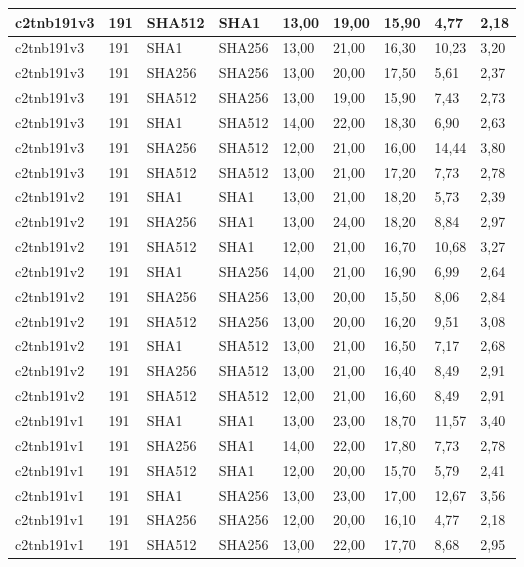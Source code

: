 \begin{longtable}{| l | l | l | l | l |l |l |l |l |}
c2tnb191v3 & 191 & SHA512 & SHA1 & 13,00 & 19,00 & 15,90 & 4,77 & 2,18 \\ \hline 
c2tnb191v3 & 191 & SHA1 & SHA256 & 13,00 & 21,00 & 16,30 & 10,23 & 3,20 \\ \hline 
c2tnb191v3 & 191 & SHA256 & SHA256 & 13,00 & 20,00 & 17,50 & 5,61 & 2,37 \\ \hline 
c2tnb191v3 & 191 & SHA512 & SHA256 & 13,00 & 19,00 & 15,90 & 7,43 & 2,73 \\ \hline 
c2tnb191v3 & 191 & SHA1 & SHA512 & 14,00 & 22,00 & 18,30 & 6,90 & 2,63 \\ \hline 
c2tnb191v3 & 191 & SHA256 & SHA512 & 12,00 & 21,00 & 16,00 & 14,44 & 3,80 \\ \hline 
c2tnb191v3 & 191 & SHA512 & SHA512 & 13,00 & 21,00 & 17,20 & 7,73 & 2,78 \\ \hline 
c2tnb191v2 & 191 & SHA1 & SHA1 & 13,00 & 21,00 & 18,20 & 5,73 & 2,39 \\ \hline 
c2tnb191v2 & 191 & SHA256 & SHA1 & 13,00 & 24,00 & 18,20 & 8,84 & 2,97 \\ \hline 
c2tnb191v2 & 191 & SHA512 & SHA1 & 12,00 & 21,00 & 16,70 & 10,68 & 3,27 \\ \hline 
c2tnb191v2 & 191 & SHA1 & SHA256 & 14,00 & 21,00 & 16,90 & 6,99 & 2,64 \\ \hline 
c2tnb191v2 & 191 & SHA256 & SHA256 & 13,00 & 20,00 & 15,50 & 8,06 & 2,84 \\ \hline 
c2tnb191v2 & 191 & SHA512 & SHA256 & 13,00 & 20,00 & 16,20 & 9,51 & 3,08 \\ \hline 
c2tnb191v2 & 191 & SHA1 & SHA512 & 13,00 & 21,00 & 16,50 & 7,17 & 2,68 \\ \hline 
c2tnb191v2 & 191 & SHA256 & SHA512 & 13,00 & 21,00 & 16,40 & 8,49 & 2,91 \\ \hline 
c2tnb191v2 & 191 & SHA512 & SHA512 & 12,00 & 21,00 & 16,60 & 8,49 & 2,91 \\ \hline 
c2tnb191v1 & 191 & SHA1 & SHA1 & 13,00 & 23,00 & 18,70 & 11,57 & 3,40 \\ \hline 
c2tnb191v1 & 191 & SHA256 & SHA1 & 14,00 & 22,00 & 17,80 & 7,73 & 2,78 \\ \hline 
c2tnb191v1 & 191 & SHA512 & SHA1 & 12,00 & 20,00 & 15,70 & 5,79 & 2,41 \\ \hline 
c2tnb191v1 & 191 & SHA1 & SHA256 & 13,00 & 23,00 & 17,00 & 12,67 & 3,56 \\ \hline 
c2tnb191v1 & 191 & SHA256 & SHA256 & 12,00 & 20,00 & 16,10 & 4,77 & 2,18 \\ \hline 
c2tnb191v1 & 191 & SHA512 & SHA256 & 13,00 & 22,00 & 17,70 & 8,68 & 2,95 \\ \hline 

\end{longtable}
